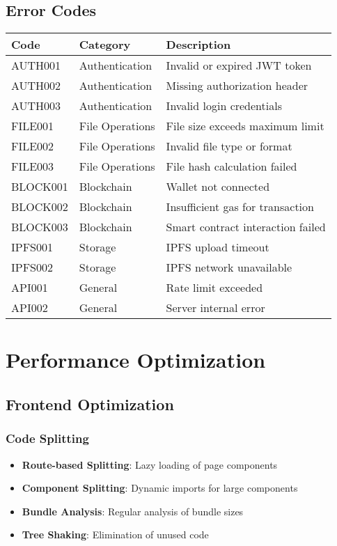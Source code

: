\documentclass[11pt,a4paper]{article}
\begin{document}
\subsection{Error Codes}

\begin{longtable}{|p{2cm}|p{3cm}|p{8cm}|}
\hline
\textbf{Code} & \textbf{Category} & \textbf{Description} \\
\hline
AUTH001 & Authentication & Invalid or expired JWT token \\
\hline
AUTH002 & Authentication & Missing authorization header \\
\hline
AUTH003 & Authentication & Invalid login credentials \\
\hline
FILE001 & File Operations & File size exceeds maximum limit \\
\hline
FILE002 & File Operations & Invalid file type or format \\
\hline
FILE003 & File Operations & File hash calculation failed \\
\hline
BLOCK001 & Blockchain & Wallet not connected \\
\hline
BLOCK002 & Blockchain & Insufficient gas for transaction \\
\hline
BLOCK003 & Blockchain & Smart contract interaction failed \\
\hline
IPFS001 & Storage & IPFS upload timeout \\
\hline
IPFS002 & Storage & IPFS network unavailable \\
\hline
API001 & General & Rate limit exceeded \\
\hline
API002 & General & Server internal error \\
\hline
\end{longtable}

\section{Performance Optimization}

\subsection{Frontend Optimization}

\subsubsection{Code Splitting}
\begin{itemize}
    \item \textbf{Route-based Splitting}: Lazy loading of page components
    \item \textbf{Component Splitting}: Dynamic imports for large components
    \item \textbf{Bundle Analysis}: Regular analysis of bundle sizes
    \item \textbf{Tree Shaking}: Elimination of unused code
\end{itemize}
\end{document}
